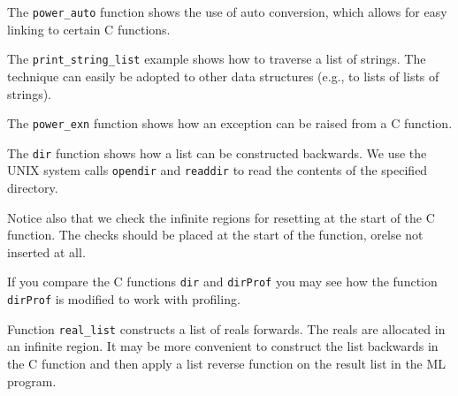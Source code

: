 \documentclass[12pt]{book}
\begin{document}
\begin{example}\label{power_auto.ex}
  The \texttt{power\_auto} function shows the
  use of auto conversion, which allows for easy linking to certain C
  functions.
\end{example}

\begin{example}\label{print_string_list.ex}
  The \texttt{print\_string\_list}
  example shows how to traverse a list of strings. The technique can
  easily be adopted to other data structures (e.g., to lists of lists
  of strings).
\end{example}

\begin{example}\label{power_exn.ex}
  The \texttt{power\_exn} function shows how an
  exception can be raised from a C function.
\end{example}

\begin{example}\label{dir.ex}
  The \texttt{dir} function shows how a list can be
  constructed backwards.  We use the UNIX system calls
  \texttt{opendir} and \texttt{readdir} to read the contents of the
  specified directory.

  Notice also that we check the infinite regions for resetting at the
  start of the C function. The checks should be placed at the start of
  the function, orelse not inserted at all.

  If you compare the C functions \texttt{dir} and \texttt{dirProf} you
  may see how the function \texttt{dirProf} is modified to work with
  profiling.
\end{example}

\begin{example}\label{real_list.ex}
  Function \texttt{real\_list} constructs a list
  of reals forwards. The reals are allocated in an infinite region. It
  may be more convenient to construct the list backwards in the C
  function and then apply a list reverse function on the result list
  in the ML program.
\end{example}
\end{document}
